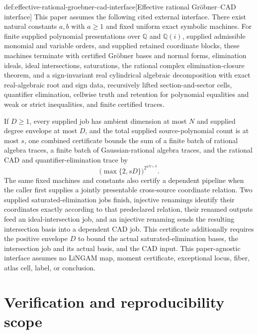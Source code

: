 \documentclass[11pt]{article}
\begin{document}
\begin{remarkv}{def:effective-rational-groebner-cad-interface}[Effective rational Gröbner--CAD interface]
This paper assumes the following cited external interface. There exist natural constants \(a,b\) with \(a\ge 1\) and fixed uniform exact symbolic machines. For finite supplied polynomial presentations over \(\mathbb Q\) and \(\mathbb Q(i)\), supplied admissible monomial and variable orders, and supplied retained coordinate blocks, these machines terminate with certified Gröbner bases and normal forms, elimination ideals, ideal intersections, saturations, the rational complex elimination-closure theorem, and a sign-invariant real cylindrical algebraic decomposition with exact real-algebraic root and sign data, recursively lifted section-and-sector cells, quantifier elimination, cellwise truth and retention for polynomial equalities and weak or strict inequalities, and finite certified traces.

If \(D\ge 1\), every supplied job has ambient dimension at most \(N\) and supplied degree envelope at most \(D\), and the total supplied source-polynomial count is at most \(s\), one combined certificate bounds the sum of a finite batch of rational algebra traces, a finite batch of Gaussian-rational algebra traces, and the rational CAD and quantifier-elimination trace by
\[
\bigl(\max\{2,sD\}\bigr)^{2^{aN+b}}.
\]
The same fixed machines and constants also certify a dependent pipeline when the caller first supplies a jointly presentable cross-source coordinate relation. Two supplied saturated-elimination jobs finish, injective renamings identify their coordinates exactly according to that predeclared relation, their renamed outputs feed an ideal-intersection job, and an injective renaming sends the resulting intersection basis into a dependent CAD job. This certificate additionally requires the positive envelope \(D\) to bound the actual saturated-elimination bases, the intersection job and its actual basis, and the CAD input. This paper-agnostic interface assumes no LiNGAM map, moment certificate, exceptional locus, fiber, atlas cell, label, or conclusion.
\end{remarkv}


\section{Verification and reproducibility scope}
\end{document}
